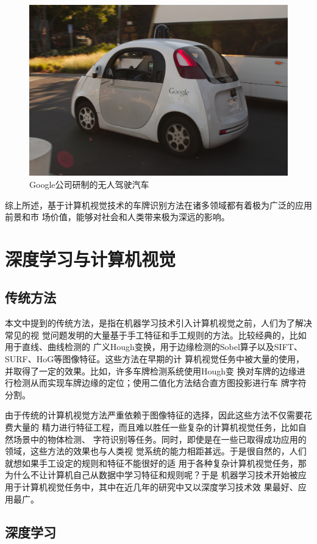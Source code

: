 \begin{figure}[ht]
  \centering
  \includegraphics[width=0.8\linewidth]{./Figure/GoogleSelfDrivingCar.jpg}
  \caption{Google公司研制的无人驾驶汽车}
\end{figure}

综上所述，基于计算机视觉技术的车牌识别方法在诸多领域都有着极为广泛的应用前景和市
场价值，能够对社会和人类带来极为深远的影响。

\section{深度学习与计算机视觉}
\subsection{传统方法}

本文中提到的传统方法，是指在机器学习技术引入计算机视觉之前，人们为了解决常见的视
觉问题发明的大量基于手工特征和手工规则的方法。比较经典的，比如用于直线、曲线检测的
广义Hough变换，用于边缘检测的Sobel算子以及SIFT、SURF、HoG等图像特征。这些方法在早期的计
算机视觉任务中被大量的使用，并取得了一定的效果。比如，许多车牌检测系统使用Hough变
换对车牌的边缘进行检测从而实现车牌边缘的定位；使用二值化方法结合直方图投影进行车
牌字符分割。

由于传统的计算机视觉方法严重依赖于图像特征的选择，因此这些方法不仅需要花费大量的
精力进行特征工程，而且难以胜任一些复杂的计算机视觉任务，比如自然场景中的物体检测、
字符识别等任务。同时，即使是在一些已取得成功应用的领域，这些方法的效果也与人类视
觉系统的能力相距甚远。于是很自然的，人们就想如果手工设定的规则和特征不能很好的适
用于各种复杂计算机视觉任务，那为什么不让计算机自己从数据中学习特征和规则呢？于是
机器学习技术开始被应用于计算机视觉任务中，其中在近几年的研究中又以深度学习技术效
果最好、应用最广。

\subsection{深度学习}

